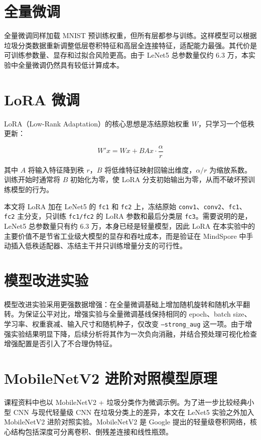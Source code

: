 \section{全量微调}

全量微调同样加载 MNIST 预训练权重，但所有层都参与训练。这样模型可以根据垃圾分类数据重新调整低层卷积特征和高层全连接特征，适配能力最强。其代价是可训练参数量、显存和过拟合风险更高。由于 LeNet5 总参数量仅约 6.3 万，本实验中全量微调仍然具有较低计算成本。

\section{LoRA 微调}

LoRA（Low-Rank Adaptation）的核心思想是冻结原始权重 $W$，只学习一个低秩更新\cite{lora2022}：

\[
W'x = Wx + BAx \cdot \frac{\alpha}{r}
\]

其中 $A$ 将输入特征降到秩 $r$，$B$ 将低维特征映射回输出维度，$\alpha/r$ 为缩放系数。训练开始时通常将 $B$ 初始化为零，使 LoRA 分支初始输出为零，从而不破坏预训练模型的行为。

本文将 LoRA 加在 LeNet5 的 \texttt{fc1} 和 \texttt{fc2} 上，冻结原始 \texttt{conv1}、\texttt{conv2}、\texttt{fc1}、\texttt{fc2} 主分支，只训练 \texttt{fc1/fc2} 的 LoRA 参数和最后分类层 \texttt{fc3}。需要说明的是，LeNet5 总参数量只有约 6.3 万，本身已经是轻量模型，因此 LoRA 在本实验中的主要价值不是节省工业级大模型的显存和吞吐成本，而是验证在 MindSpore 中手动插入低秩适配器、冻结主干并只训练增量分支的可行性。

\section{模型改进实验}

模型改进实验采用更强数据增强：在全量微调基础上增加随机旋转和随机水平翻转。为保证公平对比，增强实验与全量微调基线保持相同的 epoch、batch size、学习率、权重衰减、输入尺寸和随机种子，仅改变 \texttt{--strong\_aug} 这一项。由于增强实验结果明显下降，后续分析将其作为一次负向消融，并结合预处理可视化检查增强配置是否引入了不合理伪特征。

\section{MobileNetV2 进阶对照模型原理}

课程资料中也以 MobileNetV2 + 垃圾分类作为微调示例。为了进一步比较经典小型 CNN 与现代轻量级 CNN 在垃圾分类上的差异，本文在 LeNet5 实验之外加入 MobileNetV2 进阶对照实验。MobileNetV2 是 Google 提出的轻量级卷积网络\cite{mobilenetv2}，核心结构包括深度可分离卷积、倒残差连接和线性瓶颈。

